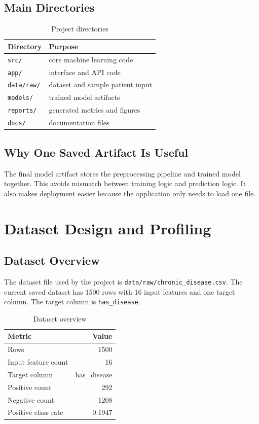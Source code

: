 \documentclass[12pt,a4paper,openany]{report}
\begin{document}
    \section{Main Directories}
    \begin{table}[H]
    \centering
    \caption{Project directories}
    \begin{tabularx}{\textwidth}{>{\raggedright\arraybackslash}p{3.5cm} X}
    \toprule
    \textbf{Directory} & \textbf{Purpose} \\
    \midrule
    \texttt{src/} & core machine learning code \\
    \texttt{app/} & interface and API code \\
    \texttt{data/raw/} & dataset and sample patient input \\
    \texttt{models/} & trained model artifacts \\
    \texttt{reports/} & generated metrics and figures \\
    \texttt{docs/} & documentation files \\
    \bottomrule
    \end{tabularx}
    \end{table}

    \section{Why One Saved Artifact Is Useful}
    The final model artifact stores the preprocessing pipeline and trained model together. This avoids mismatch between training logic and prediction logic. It also makes deployment easier because the application only needs to load one file.

    \chapter{Dataset Design and Profiling}
    \section{Dataset Overview}
    The dataset file used by the project is \texttt{data/raw/chronic\_disease.csv}. The current saved dataset has 1500 rows with 16 input features and one target column. The target column is \texttt{has\_disease}.

    \begin{table}[H]
    \centering
    \caption{Dataset overview}
    \begin{tabular}{lr}
    \toprule
    \textbf{Metric} & \textbf{Value} \\
    \midrule
    Rows & 1500 \\
    Input feature count & 16 \\
    Target column & has\_disease \\
    Positive count & 292 \\
    Negative count & 1208 \\
    Positive class rate & 0.1947 \\
    \bottomrule
    \end{tabular}
    \end{table}
\end{document}
